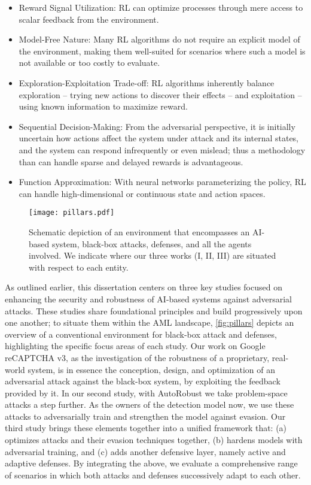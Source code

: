 \begin{itemize}
    \item Reward Signal Utilization: RL can optimize processes through mere access to scalar feedback from the environment.
    \item Model-Free Nature: Many RL algorithms do not require an explicit model of the environment, making them well-suited for scenarios where such a model is not available or too costly to evaluate.
    \item Exploration-Exploitation Trade-off: RL algorithms inherently balance exploration -- trying new actions to discover their effects -- and exploitation -- using known information to maximize reward.
    \item Sequential Decision-Making: From the adversarial perspective, it is initially uncertain how actions affect the system under attack and its internal states, and the system can respond infrequently or even mislead; thus a methodology than can handle sparse and delayed rewards is advantageous.
    \item Function Approximation: With neural networks parameterizing the policy, RL can handle high-dimensional or continuous state and action spaces.
\end{itemize}


\begin{figure}
    \centering
    \texttt{[image: pillars.pdf]}
    \caption[Schematic depiction of an environment that encompasses an AI-based system, black-box attacks, defenses, and all the agents involved.]{Schematic depiction of an environment that encompasses an AI-based system, black-box attacks, defenses, and all the agents involved. We indicate where our three works (I, II, III) are situated with respect to each entity.}
    \label{fig:pillars}
\end{figure}

As outlined earlier, this dissertation centers on three key studies focused on enhancing the security and robustness of AI-based systems against adversarial attacks.
These studies share foundational principles and build progressively upon one another; to situate them within the \gls{AML} landscape, \autoref{fig:pillars} depicts an overview of a conventional environment for black-box attack and defenses, highlighting the specific focus areas of each study.
Our work on Google reCAPTCHA v3, as the investigation of the robustness of a proprietary, real-world system, is in essence the conception, design, and optimization of an adversarial attack against the black-box system, by exploiting the feedback provided by it.
In our second study, with AutoRobust we take problem-space attacks a step further.
As the owners of the detection model now, we use these attacks to adversarially train and strengthen the model against evasion.
Our third study brings these elements together into a unified framework that:
(a) optimizes attacks and their evasion techniques together, (b) hardens models with adversarial training, and (c) adds another defensive layer, namely active and adaptive defenses.
By integrating the above, we evaluate a comprehensive range of scenarios in which both attacks and defenses successively adapt to each other.

